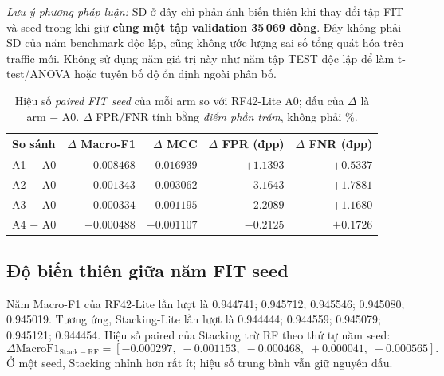 \begin{table}[htbp]
\begin{minipage}{\linewidth}
\footnotesize\emph{Lưu ý phương pháp luận:} SD ở đây chỉ phản ánh biến thiên khi thay đổi tập FIT và seed trong khi giữ \textbf{cùng một tập validation 35\,069 dòng}. Đây không phải SD của năm benchmark độc lập, cũng không ước lượng sai số tổng quát hóa trên traffic mới. Không sử dụng năm giá trị này như năm tập TEST độc lập để làm t-test/ANOVA hoặc tuyên bố độ ổn định ngoài phân bố.
\end{minipage}
\end{table}

\begin{table}[htbp]\centering
\small
\renewcommand{\arraystretch}{1.24}
\setlength{\tabcolsep}{3pt}
\caption{Hiệu số \emph{paired FIT seed} của mỗi arm so với RF42-Lite A0; dấu của $\Delta$ là arm $-$ A0. $\Delta$ FPR/FNR tính bằng \emph{điểm phần trăm}, không phải \%.}
\label{tab:p21-paired-deltas}
\begin{tabular}{lrrrr}
\toprule
So sánh & $\Delta$ Macro-F1 & $\Delta$ MCC & $\Delta$ FPR (đpp) & $\Delta$ FNR (đpp)\\\midrule
A1 $-$ A0 & $-0.008468$ & $-0.016939$ & $+1.1393$ & $+0.5337$\\
A2 $-$ A0 & $-0.001343$ & $-0.003062$ & $-3.1643$ & $+1.7881$\\
A3 $-$ A0 & $-0.000334$ & $-0.001195$ & $-2.2089$ & $+1.1680$\\
A4 $-$ A0 & $-0.000488$ & $-0.001107$ & $-0.2125$ & $+0.1726$\\\bottomrule
\end{tabular}
\end{table}

\subsection{Độ biến thiên giữa năm FIT seed}
Năm Macro-F1 của RF42-Lite lần lượt là 0.944741; 0.945712; 0.945546; 0.945080; 0.945019. Tương ứng, Stacking-Lite lần lượt là 0.944444; 0.944559; 0.945079; 0.945121; 0.944454. Hiệu số paired của Stacking trừ RF theo thứ tự năm seed:
\[
\Delta \mathrm{MacroF1}_{\mathrm{Stack-RF}} =
[-0.000297,\;-0.001153,\;-0.000468,\;+0.000041,\;-0.000565].
\]
Ở một seed, Stacking nhỉnh hơn rất ít; hiệu số trung bình vẫn giữ nguyên dấu.


